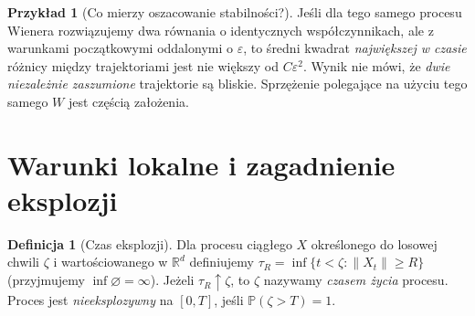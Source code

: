 \documentclass[11pt,a4paper,oneside]{report}
\numberwithin{equation}{chapter}
\theoremstyle{plain}
\theoremstyle{definition}
\newtheorem{definicja}{Definicja}[chapter]
\newtheorem{przyklad}{Przykład}[chapter]
\theoremstyle{remark}
\newcommand{\R}{\mathbb{R}}
\newcommand{\Prob}{\mathbb{P}}
\newcommand{\norm}[1]{\lVert #1\rVert}
\begin{document}
\begin{przyklad}[Co mierzy oszacowanie stabilności?]
Jeśli dla tego samego procesu Wienera rozwiązujemy
dwa równania o identycznych współczynnikach, ale
z warunkami początkowymi oddalonymi o $\varepsilon$,
to średni kwadrat \emph{największej w czasie} różnicy
między trajektoriami jest nie większy od $C\varepsilon^2$.
Wynik nie mówi, że \emph{dwie niezależnie zaszumione}
trajektorie są bliskie. Sprzężenie polegające na
użyciu tego samego $W$ jest częścią założenia.
\end{przyklad}

\section{Warunki lokalne i zagadnienie eksplozji}\label{sec:volIII:05:06}
\begin{definicja}[Czas eksplozji]\label{def:volIII:05:04}
Dla procesu ciągłego $X$ określonego do losowej chwili
$\zeta$ i wartościowanego w $\R^d$ definiujemy
$\tau_R=\inf\{t<\zeta:\norm{X_t}\ge R\}$
(przyjmujemy $\inf\varnothing=\infty$).
Jeżeli $\tau_R\uparrow\zeta$, to $\zeta$ nazywamy
\emph{czasem życia} procesu. Proces jest
\emph{nieeksplozywny} na $[0,T]$, jeśli $\Prob(\zeta>T)=1$.
\end{definicja}
\end{document}
